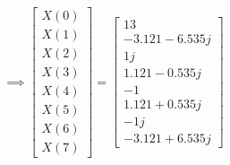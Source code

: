 \documentclass[journal,12pt,twocolumn]{IEEEtran}
\renewcommand\thesection{\arabic{section}}
\begin{document}
\begin{enumerate}[label=\thesection.\arabic*.,ref=\thesection.\theenumi]
\begin{equation}
\implies
\begin{bmatrix}
X(0) \\
X(1) \\
X(2) \\
X(3) \\
X(4) \\
X(5) \\
X(6) \\
X(7)
\end{bmatrix}
=
\begin{bmatrix}
13 \\
-3.121 - 6.535j \\
1j \\
1.121 - 0.535j \\
-1 \\
1.121 + 0.535j \\
-1j \\
-3.121 + 6.535j
\end{bmatrix}
\end{equation}


\end{enumerate}
\end{document}

